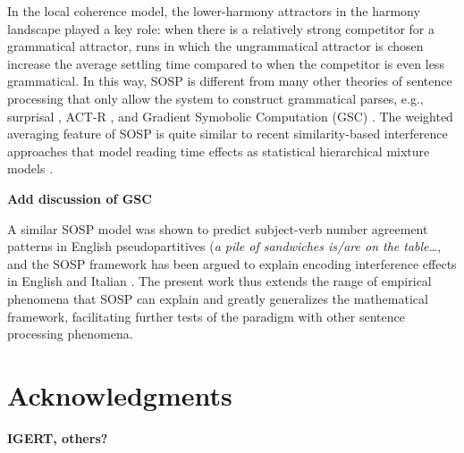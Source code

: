 \documentclass[10pt,letterpaper]{article}
\begin{document}
In the local coherence model, the lower-harmony attractors in the harmony landscape played a key role: when there is a relatively strong competitor for a grammatical attractor, runs in which the ungrammatical attractor is chosen increase the average settling time compared to when the competitor is even less grammatical. In this way, SOSP is different from many other theories of sentence processing that only allow the system to construct grammatical parses, e.g., surprisal \cite{levy2008expectation, hale2001probabilistic}, ACT-R \cite{lewis2005activation}, and Gradient Symobolic Computation (GSC) \cite{cho2016bifurcation, cho2017incremental, cho2018dynamic}. The weighted averaging feature of SOSP is quite similar to recent similarity-based interference approaches that model reading time effects as statistical hierarchical mixture models \cite{icenboim2018models, vasishth2017feature}.

\textbf{Add discussion of GSC}%

A similar SOSP model was shown to predict subject-verb number agreement patterns in English pseudopartitives (\emph{a pile of sandwiches is/are on the table\dots}, and the SOSP framework has been argued to explain encoding interference effects in English and Italian \cite{villata2018encoding}. The present work thus extends the range of empirical phenomena that SOSP can explain and greatly generalizes the mathematical framework, facilitating further tests of the paradigm with other sentence processing phenomena.



\section{Acknowledgments}
\textbf{IGERT, others?}



\setlength{\bibleftmargin}{.125in}
\setlength{\bibindent}{-\bibleftmargin}

\end{document}
